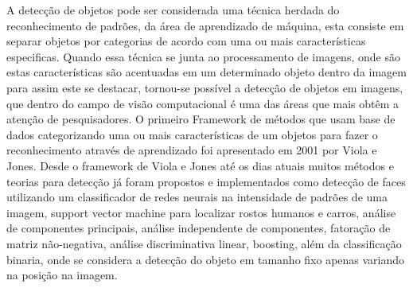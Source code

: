 A detecção de objetos pode ser considerada uma técnica herdada do reconhecimento de padrões, da área de aprendizado de máquina, esta consiste em separar objetos por categorias de acordo com uma ou mais características especificas. Quando essa técnica se junta ao processamento de imagens, onde são estas características são acentuadas em um determinado objeto dentro da imagem para assim este se destacar, tornou-se possível a detecção de objetos em imagens, que dentro do campo de visão computacional é uma das áreas que mais obtêm a atenção de pesquisadores. O primeiro Framework de métodos que usam base de dados categorizando uma ou mais características de um objetos para fazer o reconhecimento através de aprendizado foi apresentado em 2001 por Viola e Jones\cite{Viola:2001}. Desde o framework de Viola e Jones até os dias atuais muitos métodos e teorias para detecção já foram propostos e implementados como detecção de faces utilizando um classificador de redes neurais na intensidade de padrões de uma imagem, support vector machine para localizar rostos humanos e carros\cite{Nascimento:2007}, análise de componentes principais, análise independente de componentes, fatoração de matriz não-negativa, análise discriminativa linear, boosting\cite{Roth:2008}, além da classificação binaria, onde se considera a detecção do objeto em tamanho fixo apenas variando na posição na imagem\cite{AmitFelzenszwalb:2014}. 





